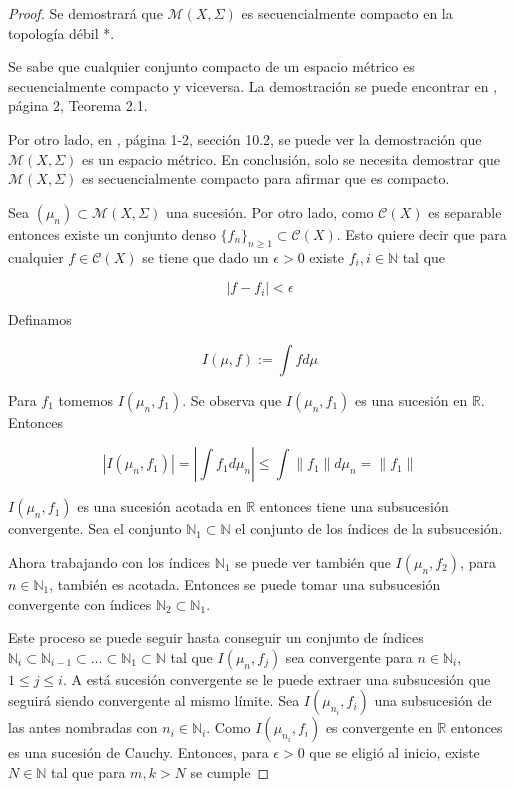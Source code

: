 \begin{proof}
	Se demostrará que $\mathcal{M}(X,\Sigma)$ es secuencialmente compacto en la topología débil *.
	
	Se sabe que cualquier conjunto compacto de un espacio métrico es secuencialmente compacto y viceversa. La demostración se puede encontrar en \cite{schep}, página 2, Teorema 2.1.
	
	Por otro lado, en \cite{walkden}, página 1-2, sección 10.2, se puede ver la demostración que $\mathcal{M}(X,\Sigma)$ es un espacio métrico. En conclusión, solo se necesita demostrar que $\mathcal{M}(X,\Sigma)$ es secuencialmente compacto para afirmar que es compacto.
	
	Sea $(\mu_n) \subset \mathcal{M}(X,\Sigma)$ una sucesión. Por otro lado, como $\mathcal{C}(X)$ es separable entonces existe un conjunto denso $\{f_n\}_{n \geq 1} \subset \mathcal{C}(X)$. Esto quiere decir que para cualquier $f \in \mathcal{C}(X)$ se tiene que dado un $\epsilon > 0$ existe $f_i, i \in \mathbb{N}$ tal que
	
	\begin{equation}
		|f - f_i| < \epsilon
	\end{equation}
	
	Definamos
	
	\begin{equation}
		I(\mu,f) := \int f d\mu
	\end{equation}
	
	Para $f_1$ tomemos $I(\mu_n,f_1)$. Se observa que $I(\mu_n,f_1)$ es una sucesión en $\mathbb{R}$. Entonces
	
	\begin{equation}
		|I(\mu_n,f_1)| = \left| \int f_1 d\mu_n \right| \leq \int \|f_1\| d\mu_n = \|f_1\|
	\end{equation} 
	
	$I(\mu_n,f_1)$ es una sucesión acotada en $\mathbb{R}$ entonces tiene una subsucesión convergente. Sea el conjunto $\mathbb{N}_1 \subset \mathbb{N}$ el conjunto de los índices de la subsucesión. 
	
	Ahora trabajando con los índices $\mathbb{N}_1$ se puede ver también que $I(\mu_n,f_2)$, para $n \in \mathbb{N}_1$, también es acotada. Entonces se puede tomar una subsucesión convergente con índices $\mathbb{N}_2 \subset \mathbb{N}_1$.
	
	Este proceso se puede seguir hasta conseguir un conjunto de índices $\mathbb{N}_i \subset \mathbb{N}_{i-1} \subset \ldots \subset \mathbb{N}_1 \subset \mathbb{N}$ tal que $I(\mu_n,f_j)$ sea convergente para $n \in \mathbb{N}_i$,$1 \leq j \leq i$. A está sucesión convergente se le puede extraer una subsucesión que seguirá siendo convergente al mismo límite. Sea $I(\mu_{n_i},f_i)$ una subsucesión de las antes nombradas con $n_i \in \mathbb{N}_i$. Como $I(\mu_{n_i},f_i)$ es convergente en $\mathbb{R}$ entonces es una sucesión de Cauchy. Entonces, para $\epsilon > 0$ que se eligió al inicio, existe $N \in \mathbb{N}$ tal que para $m,k > N$ se cumple
		

\end{proof}
